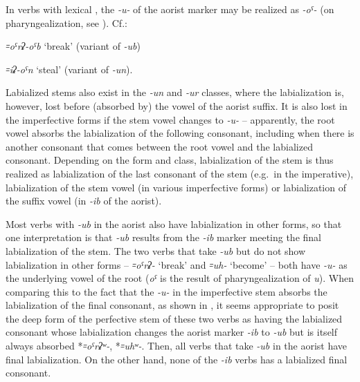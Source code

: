 \documentclass[output=paper]{langsci/langscibook}
\begin{document}
In verbs with lexical , the \emph{-u-} of the aorist
marker may be realized as \emph{-oˤ-} (on pharyngealization, see \citealt{moroz2019}).
Cf.:

\ea
\emph{꞊oˤrʡ-oˤb} `break' (variant of \emph{-ub})

\ex %
\emph{꞊iʡ-oˤn} `steal' (variant of \emph{-un}).
\z

Labialized stems also exist in the \emph{-un} and \emph{-ur} classes,
where the labialization is, however, lost before (absorbed by) the vowel
of the aorist suffix. It is also lost in the imperfective forms if the
stem vowel changes to \emph{-u-} – apparently, the root vowel absorbs
the labialization of the following consonant, including when there is
another consonant that comes between the root vowel and the labialized
consonant. Depending on the form and class, labialization of the stem is
thus realized as labialization of the last consonant of the stem (e.g.\
in the imperative), labialization of the stem vowel (in various
imperfective forms) or labialization of the suffix vowel (in \emph{-ib}
of the aorist).


Most verbs with \emph{-ub} in the aorist also have labialization in
other forms, so that one interpretation is that \emph{-ub} results from
the \emph{-ib} marker meeting the final labialization of the stem. The
two verbs that take \emph{-ub} but do not show labialization in other
forms – \emph{꞊oˤrʡ-} `break' and \emph{꞊uh-} `become' – both have
\emph{-u-} as the
underlying vowel of the root (\emph{oˤ} is the result
of pharyngealization of \emph{u}). When comparing this to the fact that
the \emph{-u-} in the imperfective stem absorbs the labialization of the
final consonant, as shown in \tabref{tab:4:8}, it seems appropriate to
posit the deep form of the perfective stem of these two verbs as having
the labialized consonant whose labialization changes the aorist marker
\emph{-ib} to \emph{-ub} but is itself always absorbed *\emph{꞊oˤrʡʷ-},
*\emph{꞊uhʷ-}. Then, all verbs that take \emph{-ub} in the aorist have
final labialization. On the other hand, none of the \emph{-ib} verbs has
a labialized final consonant.
\end{document}
